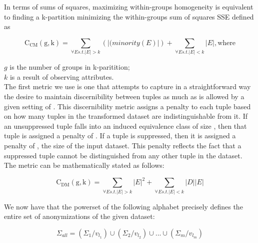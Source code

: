 \documentclass[]{seismica}
\begin{document}
    In terms of sums of squares, maximizing within-groups homogeneity is equivalent to finding a k-partition minimizing the within-groups sum of squares SSE defined as

    \begin{equation}
        \mathrm{C_{CM}(g,k)} = \sum_{\forall E s.t. \left | E \right | > k}
        (\left | (minority(E) \right |) + \sum_{\forall E s.t. \left | E \right | < k}
        \left | E \right |,
        \text{where}
    \end{equation}

    $g$ is the number of groups in k-paritition;\\
    $k$ is a result of observing attributes.\\

The first metric we use is one that attempts to capture in a straightforward way the desire to maintain discernibility between tuples as much as is allowed by a given setting of . This discernibility metric assigns a penalty to each tuple based on how many tuples in the transformed dataset are indistinguishable from it. If an unsuppressed tuple falls into an induced equivalence class of size , then that tuple is assigned a penalty of . If a tuple is suppressed, then it is assigned a penalty of , the size of the input dataset. This penalty reflects the fact that a suppressed tuple cannot be distinguished from any other tuple in the dataset. The metric can be mathematically stated as follows:

    \begin{equation}
        \mathrm{C_{DM}(g,k)} = \sum_{\forall E s.t. \left | E \right | > k}
        \left | E \right |^2 + \sum_{\forall E s.t. \left | E \right | < k}
        \left |D \right | \left | E \right |
    \end{equation}

    We now have that the powerset of the following alphabet precisely defines the entire set of anonymizations of the given dataset:

    \begin{equation}
        \Sigma_{all} = (\Sigma_1 / v_{l_1})
        \cup (\Sigma_2/ v_{l_2})
        \cup ...
        \cup (\Sigma_m / v_{l_m})
    \end{equation}
\end{document}
